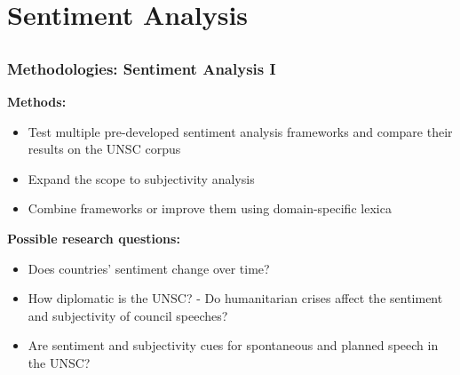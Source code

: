 \documentclass{beamer}
\begin{document}
\section{Sentiment Analysis}
\subsection{}
\begin{framefont}{\footnotesize}
	\begin{frame}
		\frametitle{Methodologies: Sentiment Analysis I}
		\textbf{Methods:}
		\begin{itemize}
			\item Test multiple pre-developed sentiment analysis frameworks and compare their results on the UNSC corpus
			\item Expand the scope to subjectivity analysis
			\item Combine frameworks or improve them using domain-specific lexica
		\end{itemize}
		    \textbf{Possible research questions:}
		    \begin{itemize}
		        \item Does countries' sentiment change over time?
		        \item How diplomatic is the UNSC? - Do humanitarian crises affect the sentiment and subjectivity of council speeches?
		        \item Are sentiment and subjectivity cues for spontaneous and planned speech in the UNSC?
		    \end{itemize}
	\end{frame}
\end{framefont}
\end{document}
